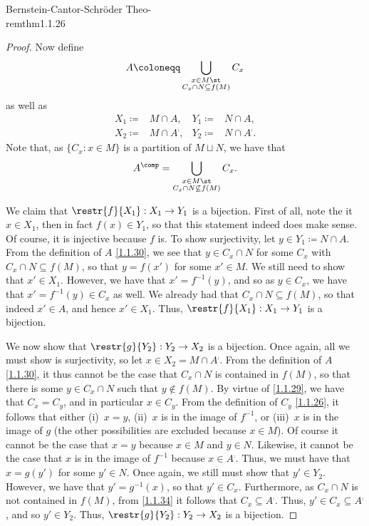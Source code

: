 \begin{thm}{Bernstein-Cantor-Schröder Theo-\\rem}{thm1.1.26}
\begin{proof}
		Now define
		\begin{equation}\label{1.1.30}
		A\coloneqq \bigcup _{\substack{x\in M\st \\ C_x\cap N\subseteq f(M)}}C_x
		\end{equation}
		as well as
		\begin{subequations}
			\begin{align}
				X_1\coloneqq&M\cap A, & Y_1\coloneqq&N\cap A, \\
				X_2\coloneqq&M\cap A^{\comp}, & Y_2\coloneqq&N\cap A^{\comp}.
			\end{align}
		\end{subequations}
		Note that, as $\{ C_x:x\in M\}$ is a partition of $M\sqcup N$, we have that
		\begin{equation}\label{1.1.34}
		A^{\comp}=\bigcup _{\substack{x\in M\st \\ C_x\cap N\not \subseteq f(M)}}C_x.
		\end{equation}
		
		We claim that $\restr{f}{X_1}:X_1\rightarrow Y_1$ is a bijection.  First of all, note the it $x\in X_1$, then in fact $f(x)\in Y_1$, so that this statement indeed does make sense.  Of course, it is injective because $f$ is.  To show surjectivity, let $y\in Y_1\coloneqq N\cap A$.  From the definition of $A$ \eqref{1.1.30}, we see that $y\in C_x\cap N$ for some $C_x$ with $C_x\cap N\subseteq f(M)$, so that $y=f(x')$ for some $x'\in M$.  We still need to show that $x'\in X_1$.  However, we have that $x'=f^{-1}(y)$, and so as $y\in C_x$, we have that $x'=f^{-1}(y)\in C_x$ as well.  We already had that $C_x\cap N\subseteq f(M)$, so that indeed $x'\in A$, and hence $x'\in X_1$.  Thus, $\restr{f}{X_1}:X_1\rightarrow Y_1$ is a bijection.
		
		We now show that $\restr{g}{Y_2}:Y_2\rightarrow X_2$ is a bijection.  Once again, all we must show is surjectivity, so let $x\in X_2=M\cap A^{\comp}$. From the definition of $A$ \eqref{1.1.30}, it thus cannot be the case that $C_x\cap N$ is contained in $f(M)$, so that there is some $y\in C_x\cap N$ such that $y\notin f(M)$.  By virtue of \eqref{1.1.29}, we have that $C_x=C_y$, and in particular $x\in C_y$.  From the definition of $C_y$ \eqref{1.1.26}, it follows that either (i)~$x=y$, (ii)~$x$ is in the image of $f^{-1}$, or (iii)~$x$ is in the image of $g$ (the other possibilities are excluded because $x\in M$).  Of course it cannot be the case that $x=y$ because $x\in M$ and $y\in N$.  Likewise, it cannot be the case that $x$ is in the image of $f^{-1}$ because $x\in A^{\comp}$.  Thus, we must have that $x=g(y')$ for some $y'\in N$.  Once again, we still must show that $y'\in Y_2$.  However, we have that $y'=g^{-1}(x)$, so that $y'\in C_x$.  Furthermore, as $C_x\cap N$ is not contained in $f(M)$, from \eqref{1.1.34} it follows that $C_x\subseteq A^{\comp}$.  Thus, $y'\in C_x\subseteq A^{\comp}$, and so $y'\in Y_2$.  Thus, $\restr{g}{Y_2}:Y_2\rightarrow X_2$ is a bijection.
		

\end{proof}
\end{thm}
